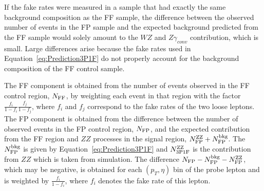 If the fake rates were measured in a sample that had exactly the same
background composition as the FF sample, the difference between the
observed number of events in the FP sample and the expected background
predicted from the FF sample would solely amount to the $WZ$ and $Z\gamma_{conv}$
contribution, which is small. Large differences arise because the fake rates used in
Equation~\ref{eq:Prediction3P1F} do not properly account for the background
composition of the FF control sample.


The FF component is obtained from the number of
  events observed in the FF control region, $N_{\rm FF}$, by
  weighting each event in that region with the factor
  $\frac{f_{i}}{1-f_{i}} \frac{f_{j}}{1-f_{j}}$, where $f_{i}$ and
  $f_{j}$ correspond to the fake rates of the two loose leptons.
The FP component is obtained from the
   difference between the number of observed events in the FP control
   region, $N_{\rm FP}$, and the expected contribution from the FF
   region and $ZZ$ processes in the signal region, $N^{\rm ZZ}_{\rm FP} +
   N^{\rm bkg}_{\rm FP}$. The $N^{\rm bkg}_{\rm FP}$ is given by 
   Equation~\ref{eq:Prediction3P1F} and $N^{\rm ZZ}_{\rm 3P1F}$ is the
   contribution from $ZZ$ which is taken from simulation. 
   The difference $N_{\rm FP} -  N^{\rm bkg}_{\rm FP} - N^{\rm ZZ}_{\rm FP}$,
   which may be negative,
   is obtained for each $(p_T, \eta)$ bin of the probe lepton and is weighted 
   by $\frac{f_i} {1 - f_i}$, where $f_i$ denotes the fake rate of
   this lepton.

